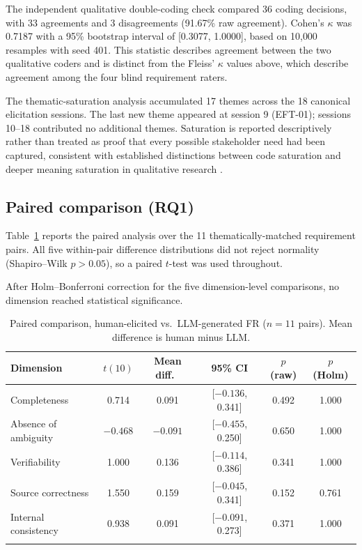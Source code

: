 \documentclass[pdflatex,sn-basic]{sn-jnl}
\begin{document}
The independent qualitative double-coding check compared 36 coding decisions, with 33 agreements and 3 disagreements (91.67\% raw agreement). Cohen's $\kappa$ was 0.7187 with a 95\% bootstrap interval of [0.3077, 1.0000], based on 10{,}000 resamples with seed 401. This statistic describes agreement between the two qualitative coders and is distinct from the Fleiss' $\kappa$ values above, which describe agreement among the four blind requirement raters.

The thematic-saturation analysis accumulated 17 themes across the 18 canonical elicitation sessions. The last new theme appeared at session 9 (EFT-01); sessions 10--18 contributed no additional themes. Saturation is reported descriptively rather than treated as proof that every possible stakeholder need had been captured, consistent with established distinctions between code saturation and deeper meaning saturation in qualitative research \citep{guest2006interviews,hennink2017codesaturation}.

\subsection{Paired comparison (RQ1)}

Table~\ref{tab:pareado} reports the paired analysis over the 11 thematically-matched requirement pairs. All five within-pair difference distributions did not reject normality (Shapiro--Wilk $p > 0.05$), so a paired $t$-test was used throughout.

After Holm--Bonferroni correction for the five dimension-level comparisons, no dimension reached statistical significance.

\begin{table}[h]
\centering
\caption{Paired comparison, human-elicited vs.\ LLM-generated FR ($n=11$ pairs). Mean difference is human minus LLM.}
\label{tab:pareado}
\small
\begin{tabular}{lccccc}
\toprule
Dimension & $t(10)$ & Mean diff.\ & 95\% CI & $p$ (raw) & $p$ (Holm) \\
\midrule
Completeness & 0.714 & 0.091 & [$-0.136$, 0.341] & 0.492 & 1.000 \\
Absence of ambiguity & $-0.468$ & $-0.091$ & [$-0.455$, 0.250] & 0.650 & 1.000 \\
Verifiability & 1.000 & 0.136 & [$-0.114$, 0.386] & 0.341 & 1.000 \\
Source correctness & 1.550 & 0.159 & [$-0.045$, 0.341] & 0.152 & 0.761 \\
Internal consistency & 0.938 & 0.091 & [$-0.091$, 0.273] & 0.371 & 1.000 \\
\botrule
\end{tabular}
\end{table}
\end{document}
